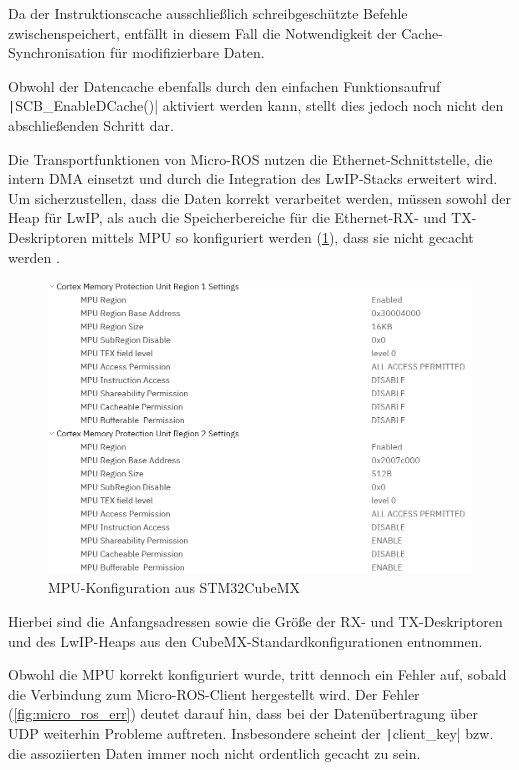 Da der Instruktionscache ausschließlich schreibgeschützte Befehle
zwischenspeichert, entfällt in diesem Fall die Notwendigkeit der
Cache-Synchronisation für modifizierbare Daten.

Obwohl der Datencache ebenfalls durch den einfachen Funktionsaufruf
\texttt|SCB_EnableDCache()| aktiviert werden kann, stellt dies jedoch
noch nicht den abschließenden Schritt dar.

Die Transportfunktionen von Micro-ROS nutzen die Ethernet-Schnittstelle, die
intern DMA einsetzt und durch die Integration des \ac{LwIP}-Stacks erweitert
wird. Um sicherzustellen, dass die Daten korrekt verarbeitet werden, müssen
sowohl der Heap für LwIP, als auch die Speicherbereiche für die Ethernet-RX- und
TX-Deskriptoren mittels \ac{MPU} so konfiguriert werden (\ref{fig:conf_cubemx}),
dass sie nicht gecacht werden \cite{STM32H7_LwIP_Examples}.

\begin{figure}[H]
    \centering
    \includegraphics[width=1\textwidth]{assets/mpu_conf_cubemx}
    \caption{MPU-Konfiguration aus STM32CubeMX}
    \label{fig:conf_cubemx}
\end{figure}

Hierbei sind die Anfangsadressen sowie die Größe der RX- und TX-Deskriptoren
und des LwIP-Heaps aus den CubeMX-Standardkonfigurationen entnommen.

Obwohl die MPU korrekt konfiguriert wurde, tritt dennoch ein Fehler auf, sobald
die Verbindung zum Micro-ROS-Client hergestellt wird. Der Fehler
(\ref{fig:micro_ros_err}) deutet darauf hin, dass bei der Datenübertragung über
UDP weiterhin Probleme auftreten. Insbesondere scheint der
\texttt|client_key| bzw. die assoziierten Daten immer noch nicht
ordentlich gecacht zu sein.

